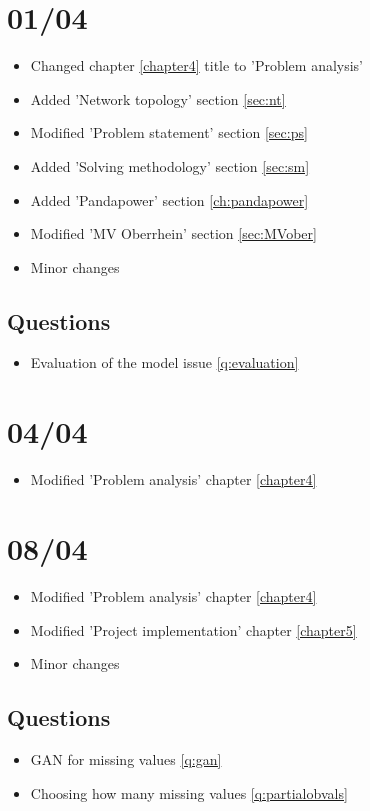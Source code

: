 \section{01/04}
\begin{itemize}
    \item Changed chapter \ref{chapter4} title to 'Problem analysis'
    \item Added 'Network topology' section \ref{sec:nt}
    \item Modified 'Problem statement' section \ref{sec:ps}
    \item Added 'Solving methodology' section \ref{sec:sm}
    \item Added 'Pandapower' section \ref{ch:pandapower}
    \item Modified 'MV Oberrhein' section \ref{sec:MVober}
    \item Minor changes
\end{itemize}

\subsection{Questions}
\begin{itemize}
    \item Evaluation of the model issue \ref{q:evaluation}
\end{itemize}

\section{04/04}
\begin{itemize}
    \item Modified 'Problem analysis' chapter \ref{chapter4}
\end{itemize}

\section{08/04}
\begin{itemize}
    \item Modified 'Problem analysis' chapter \ref{chapter4}
    \item Modified 'Project implementation' chapter \ref{chapter5}
    \item Minor changes
\end{itemize}

\subsection{Questions}
\begin{itemize}
    \item \gls{GAN} for missing values \ref{q:gan}
    \item Choosing how many missing values \ref{q:partialobvals}
\end{itemize}

